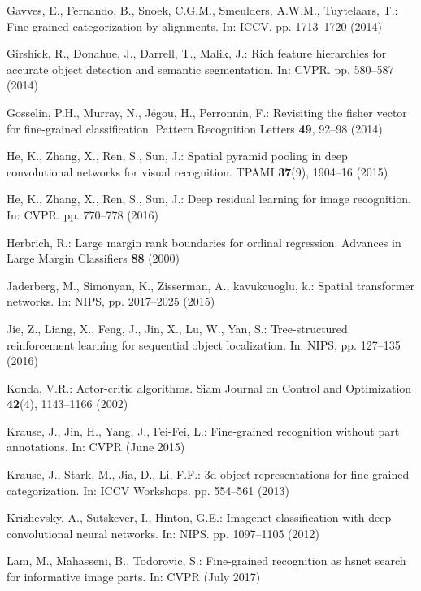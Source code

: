 \documentclass[runningheads]{llncs}
\begin{document}
\begin{thebibliography}{10}
Gavves, E., Fernando, B., Snoek, C.G.M., Smeulders, A.W.M., Tuytelaars, T.:
  Fine-grained categorization by alignments. In: ICCV. pp. 1713--1720 (2014)

Girshick, R., Donahue, J., Darrell, T., Malik, J.: Rich feature hierarchies for
  accurate object detection and semantic segmentation. In: CVPR. pp. 580--587
  (2014)

Gosselin, P.H., Murray, N., Jégou, H., Perronnin, F.: Revisiting the fisher
  vector for fine-grained classification. Pattern Recognition Letters
  \textbf{49},  92--98 (2014)

He, K., Zhang, X., Ren, S., Sun, J.: Spatial pyramid pooling in deep
  convolutional networks for visual recognition. TPAMI  \textbf{37}(9),
  1904--16 (2015)

He, K., Zhang, X., Ren, S., Sun, J.: Deep residual learning for image
  recognition. In: CVPR. pp. 770--778 (2016)

Herbrich, R.: Large margin rank boundaries for ordinal regression. Advances in
  Large Margin Classifiers  \textbf{88} (2000)

Jaderberg, M., Simonyan, K., Zisserman, A., kavukcuoglu, k.: Spatial
  transformer networks. In: NIPS, pp. 2017--2025 (2015)

Jie, Z., Liang, X., Feng, J., Jin, X., Lu, W., Yan, S.: Tree-structured
  reinforcement learning for sequential object localization. In: NIPS, pp.
  127--135 (2016)

Konda, V.R.: Actor-critic algorithms. Siam Journal on Control and Optimization
  \textbf{42}(4),  1143--1166 (2002)

Krause, J., Jin, H., Yang, J., Fei-Fei, L.: Fine-grained recognition without
  part annotations. In: CVPR (June 2015)

Krause, J., Stark, M., Jia, D., Li, F.F.: 3d object representations for
  fine-grained categorization. In: ICCV Workshops. pp. 554--561 (2013)

Krizhevsky, A., Sutskever, I., Hinton, G.E.: Imagenet classification with deep
  convolutional neural networks. In: NIPS. pp. 1097--1105 (2012)

Lam, M., Mahasseni, B., Todorovic, S.: Fine-grained recognition as hsnet search
  for informative image parts. In: CVPR (July 2017)


\end{thebibliography}
\end{document}
